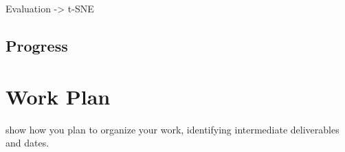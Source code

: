 \documentclass{interim}
\begin{document}
Evaluation -> t-SNE \cite{van2008visualizing}


\subsection{Progress}


\section{Work Plan}
show how you plan to organize your work, identifying intermediate deliverables and dates.



\end{document}
